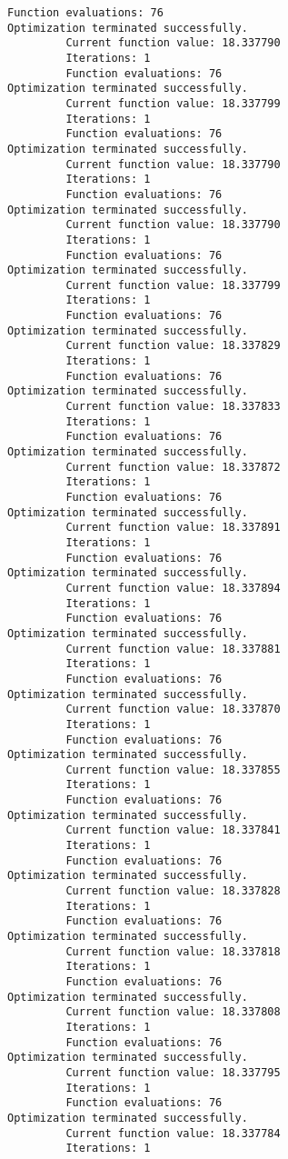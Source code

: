 \documentclass[11pt]{article}
\begin{document}
\begin{Verbatim}[commandchars=\\\{\}]
         Function evaluations: 76
Optimization terminated successfully.
         Current function value: 18.337790
         Iterations: 1
         Function evaluations: 76
Optimization terminated successfully.
         Current function value: 18.337799
         Iterations: 1
         Function evaluations: 76
Optimization terminated successfully.
         Current function value: 18.337790
         Iterations: 1
         Function evaluations: 76
Optimization terminated successfully.
         Current function value: 18.337790
         Iterations: 1
         Function evaluations: 76
Optimization terminated successfully.
         Current function value: 18.337799
         Iterations: 1
         Function evaluations: 76
Optimization terminated successfully.
         Current function value: 18.337829
         Iterations: 1
         Function evaluations: 76
Optimization terminated successfully.
         Current function value: 18.337833
         Iterations: 1
         Function evaluations: 76
Optimization terminated successfully.
         Current function value: 18.337872
         Iterations: 1
         Function evaluations: 76
Optimization terminated successfully.
         Current function value: 18.337891
         Iterations: 1
         Function evaluations: 76
Optimization terminated successfully.
         Current function value: 18.337894
         Iterations: 1
         Function evaluations: 76
Optimization terminated successfully.
         Current function value: 18.337881
         Iterations: 1
         Function evaluations: 76
Optimization terminated successfully.
         Current function value: 18.337870
         Iterations: 1
         Function evaluations: 76
Optimization terminated successfully.
         Current function value: 18.337855
         Iterations: 1
         Function evaluations: 76
Optimization terminated successfully.
         Current function value: 18.337841
         Iterations: 1
         Function evaluations: 76
Optimization terminated successfully.
         Current function value: 18.337828
         Iterations: 1
         Function evaluations: 76
Optimization terminated successfully.
         Current function value: 18.337818
         Iterations: 1
         Function evaluations: 76
Optimization terminated successfully.
         Current function value: 18.337808
         Iterations: 1
         Function evaluations: 76
Optimization terminated successfully.
         Current function value: 18.337795
         Iterations: 1
         Function evaluations: 76
Optimization terminated successfully.
         Current function value: 18.337784
         Iterations: 1

\end{Verbatim}
\end{document}
